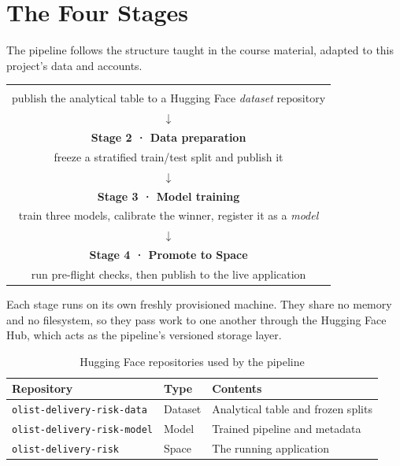 \documentclass[11pt,a4paper]{report}
\begin{document}
\section{The Four Stages}

The pipeline follows the structure taught in the course material, adapted to
this project's data and accounts.

\begin{center}
\begin{tabular}{@{}c@{}}
\fbox{\begin{minipage}{0.9\textwidth}
\centering
\vspace{2mm}
\textbf{Stage 1 · Register dataset} \\
publish the analytical table to a Hugging Face \textit{dataset} repository \\
$\downarrow$ \\
\textbf{Stage 2 · Data preparation} \\
freeze a stratified train/test split and publish it \\
$\downarrow$ \\
\textbf{Stage 3 · Model training} \\
train three models, calibrate the winner, register it as a \textit{model} \\
$\downarrow$ \\
\textbf{Stage 4 · Promote to Space} \\
run pre-flight checks, then publish to the live application
\vspace{2mm}
\end{minipage}}
\end{tabular}
\end{center}

Each stage runs on its own freshly provisioned machine. They share no memory and
no filesystem, so they pass work to one another through the Hugging Face Hub,
which acts as the pipeline's versioned storage layer.

\begin{table}[H]
\centering
\caption{Hugging Face repositories used by the pipeline}
\begin{tabular}{@{}lll@{}}
\toprule
\textbf{Repository} & \textbf{Type} & \textbf{Contents} \\
\midrule
\texttt{olist-delivery-risk-data} & Dataset & Analytical table and frozen splits \\
\texttt{olist-delivery-risk-model} & Model & Trained pipeline and metadata \\
\texttt{olist-delivery-risk} & Space & The running application \\
\bottomrule
\end{tabular}
\end{table}
\end{document}
